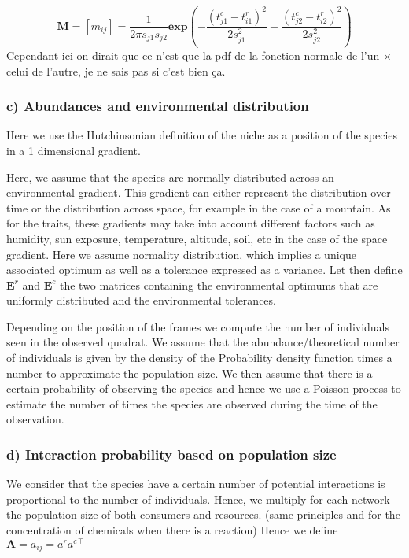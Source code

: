 \documentclass{article}
\begin{document}
$$\textbf{M} = [m_{ij}]=\frac{1}{2\pi s_{j1}s_{j2}} \textbf{exp}\left(-\frac{(t^c_{j1} - t^r_{i1})^2}{2s^2_{j1}} - \frac{(t^c_{j2} - t^r_{i2})^2}{2s^2_{j2}}\right)$$
Cependant ici on dirait que ce n'est que la pdf de la fonction normale de l'un $\times$ celui de l'autre, je ne sais pas si c'est bien ça.




\subsubsection{c) Abundances and environmental distribution}
Here we use the Hutchinsonian definition of the niche as a position of the species in a 1 dimensional gradient.

Here, we assume that the species are normally distributed across an environmental gradient. This gradient can either represent the distribution over time or the distribution across space, for example in the case of a mountain. As for the traits, these gradients may take into account different factors such as humidity, sun exposure, temperature, altitude, soil, etc in the case of the space gradient.
Here we assume normality distribution, which implies a unique associated optimum as well as a tolerance expressed as a variance. Let then define $\textbf{E}^r$ and $\textbf{E}^c$ the two matrices containing the environmental optimums that are uniformly distributed and the environmental tolerances.

Depending on the position of the frames we compute the number of individuals seen in the observed quadrat. We assume that the abundance/theoretical number of individuals is given by the density of the Probability density function times a number to approximate the population size. We then assume that there is a certain probability of observing the species and hence we use a Poisson process to estimate the number of times the species are observed during the time of the observation.


\subsubsection{d) Interaction probability based on population size}
We consider that the species have a certain number of potential interactions is proportional to the number of individuals. Hence, we multiply for each network the population size of both consumers and resources. (same principles and for the concentration of chemicals when there is a reaction)
Hence we define $\textbf{A} = a_{ij} = a^r a^{c\intercal}$
\end{document}
